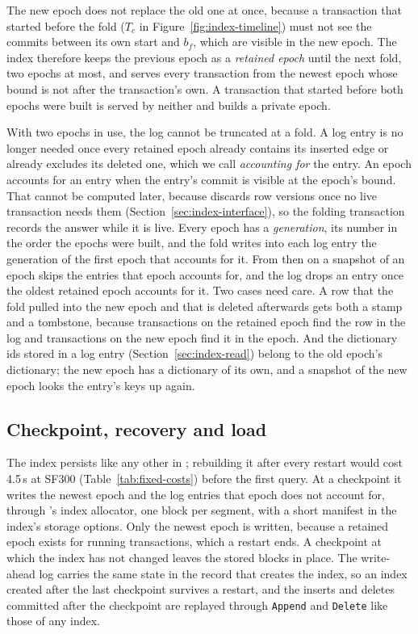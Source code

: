 The new epoch does not replace the old one at once, because a transaction that started before the fold
(\mbox{$T_c$} in Figure~\ref{fig:index-timeline}) must not see the commits between its own start and $b_f$, which are visible in the
new epoch. The index therefore keeps the previous epoch as a \emph{retained epoch} until the next fold, two epochs at most,
and serves every transaction from the newest epoch whose bound is not after the transaction's own. A transaction that
started before both epochs were built is served by neither and builds a private epoch.

With two epochs in use, the log cannot be truncated at a fold. A log entry is no longer needed once every retained epoch already
contains its inserted edge or already excludes its deleted one, which we call \emph{accounting for} the entry. An epoch
accounts for an entry when the entry's commit is visible at the epoch's bound. That cannot be computed later, because
\duckdb discards row versions once no live transaction needs them (Section~\ref{sec:index-interface}), so the folding
transaction records the answer while it is live. Every epoch has a \emph{generation}, its number in
the order the epochs were built, and the fold writes into each log entry the generation of the first epoch that
accounts for it.
From then on a snapshot of an epoch skips the entries that epoch accounts for, and the log drops an entry once the
oldest retained epoch accounts for it. Two cases need care. A row that the fold pulled into the new epoch and that is deleted afterwards gets both a
stamp and a tombstone, because transactions on the retained epoch find the row in the log and transactions on the new
epoch find it in the epoch. And the dictionary ids stored in a log entry (Section~\ref{sec:index-read}) belong to the
old epoch's dictionary; the new epoch has a dictionary of its own, and a snapshot of the new epoch looks the entry's
keys up again.

\subsection{Checkpoint, recovery and load}
\label{sec:index-storage}

The index persists like any other in \duckdb; rebuilding it after every restart would cost 4.5\,s at SF300
(Table~\ref{tab:fixed-costs}) before the first query. At a checkpoint it writes the newest epoch and the log entries that epoch
does not account for, through \duckdb's index allocator, one block per segment, with a short manifest in the index's
storage options. Only the newest epoch is written, because a retained epoch exists for running transactions, which a
restart ends. A checkpoint at which the index has not changed leaves the stored blocks in place. The write-ahead log carries the same state in the record that creates the index, so an index created after
the last checkpoint survives a restart, and the inserts and deletes committed after the checkpoint are replayed
through \texttt{Append} and \texttt{Delete} like those of any index.

